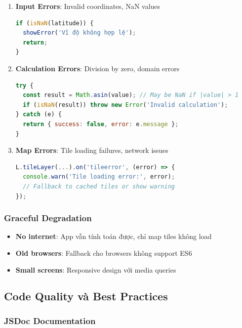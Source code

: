 \begin{enumerate}
    \item \textbf{Input Errors}: Invalid coordinates, NaN values
    \begin{lstlisting}[language=JavaScript]
if (isNaN(latitude)) {
  showError('Vĩ độ không hợp lệ');
  return;
}
    \end{lstlisting}
    
    \item \textbf{Calculation Errors}: Division by zero, domain errors
    \begin{lstlisting}[language=JavaScript]
try {
  const result = Math.asin(value); // May be NaN if |value| > 1
  if (isNaN(result)) throw new Error('Invalid calculation');
} catch (e) {
  return { success: false, error: e.message };
}
    \end{lstlisting}
    
    \item \textbf{Map Errors}: Tile loading failures, network issues
    \begin{lstlisting}[language=JavaScript]
L.tileLayer(...).on('tileerror', (error) => {
  console.warn('Tile loading error:', error);
  // Fallback to cached tiles or show warning
});
    \end{lstlisting}
\end{enumerate}

\subsubsection{Graceful Degradation}

\begin{itemize}
    \item \textbf{No internet}: App vẫn tính toán được, chỉ map tiles không load
    \item \textbf{Old browsers}: Fallback cho browsers không support ES6
    \item \textbf{Small screens}: Responsive design với media queries
\end{itemize}

\subsection{Code Quality và Best Practices}

\subsubsection{JSDoc Documentation}

